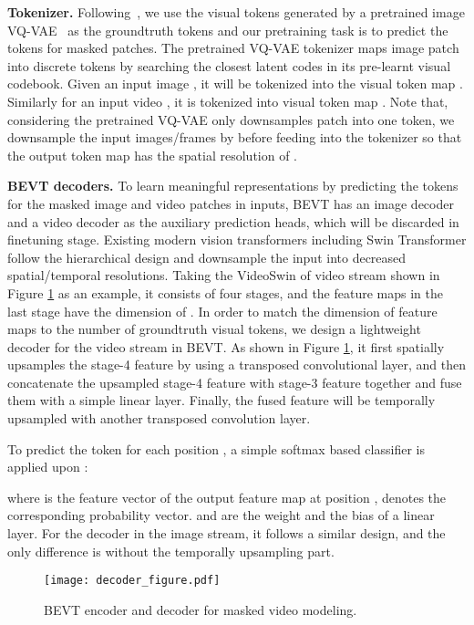 \documentclass[10pt,twocolumn,letterpaper]{article}
\makeatletter
\newcommand*{\system}{BEVT\@\xspace}
\makeatother
\begin{document}
\vspace{0.05in}
\noindent\textbf{Tokenizer.} Following~\cite{bao2021beit}, we use the visual tokens generated by a pretrained image VQ-VAE~\cite{dalle} as the groundtruth tokens and our pretraining task is to predict the tokens for masked patches. The pretrained VQ-VAE tokenizer maps image patch into discrete tokens  by searching the closest latent codes in its pre-learnt visual codebook. Given an input image , it will be tokenized into the visual token map . Similarly for an input video  ,  it is tokenized into visual token map . Note that, considering the pretrained VQ-VAE only downsamples  patch into one token, we downsample the input images/frames by  before feeding into the tokenizer so that the output token map has the spatial resolution of .

\vspace{0.05in}
\noindent\textbf{\system decoders.} To learn meaningful representations by predicting the tokens for the masked image and video patches in inputs, \system has an image decoder and a video decoder as the auxiliary prediction heads, which will be discarded in finetuning stage. 
Existing modern vision transformers including Swin Transformer follow the hierarchical design and downsample the input into decreased spatial/temporal resolutions. Taking the VideoSwin of video stream shown in Figure \ref{fig:decoder} as an example, it consists of four stages, and the feature maps  in the last stage have the dimension of . In order to match the dimension of feature maps to the number of groundtruth visual tokens, we design a lightweight decoder for the video stream in BEVT. As shown in Figure \ref{fig:decoder}, it first spatially upsamples the stage-4 feature  by using a transposed convolutional layer, and then concatenate the upsampled stage-4 feature  with stage-3 feature  together and fuse them with a simple linear layer. Finally, the fused feature  will be temporally upsampled with another transposed convolution layer.  



To predict the token for each position , a simple softmax based classifier is applied upon :

where  is the feature vector of the output feature map  at position ,  denotes the corresponding probability vector.  and  are the weight and the bias of a linear layer. For the decoder in the image stream, it follows a similar design, and the only difference is without the temporally upsampling part.

\begin{figure}[t]
\begin{center}
   \texttt{[image: decoder\_figure.pdf]}
\end{center}
   \vspace{-0.2in}
   \caption{\system encoder and decoder for masked video modeling. }
\label{fig:decoder}
\end{figure}
\end{document}
